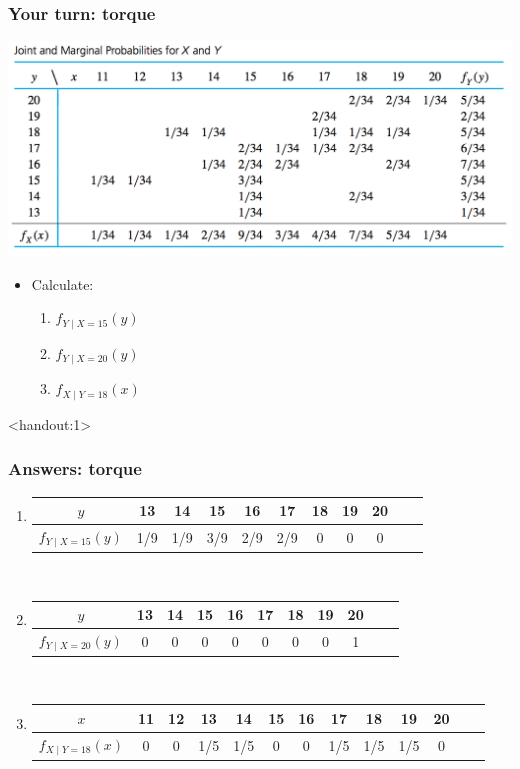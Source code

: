 \documentclass[handout]{beamer}\usepackage{graphicx, color}
\newcommand{\answers}{1}
\providecommand{\q}{$\quad$ \newline}
\numberwithin{equation}{section}
\begin{document}
\begin{frame}
\frametitle{Your turn: torque}
 \includegraphics{../../fig/torquetablemar.png}
\begin{itemize}
\item Calculate:
\begin{enumerate}[1. ]
\item $f_{Y \mid X = 15}(y)$
\item $f_{Y \mid X = 20}(y)$
\item $f_{X \mid Y = 18}(x)$
\end{enumerate}
\end{itemize}
\end{frame}

\begin{frame}<handout:\answers>
\frametitle{Answers: torque} \scriptsize
\begin{enumerate}[1. ]
\item 
\begin{tabular}{ccccccccccc}
$y$ & 13 & 14 & 15 & 16 & 17 & 18 & 19 & 20 \\ \hline
$f_{Y \mid X = 15}(y)$ & 1/9 & 1/9 & 3/9 & 2/9 & 2/9 & 0 & 0 & 0
\end{tabular} \q
\item 
\begin{tabular}{ccccccccccc}
$y$ & 13 & 14 & 15 & 16 & 17 & 18 & 19 & 20 \\ \hline
$f_{Y \mid X = 20}(y)$ & 0 & 0 & 0 & 0 & 0 & 0 & 0 & 1
\end{tabular} \q
\item 
\begin{tabular}{ccccccccccccc}
$x$ & 11 & 12 & 13 & 14 & 15 & 16 & 17 & 18 & 19 & 20 \\ \hline
$f_{X \mid Y = 18}(x)$ & 0 & 0 & 1/5 & 1/5 & 0 & 0 & 1/5 & 1/5 & 1/5 & 0
\end{tabular} \q
\end{enumerate}
\end{frame}
\end{document}

